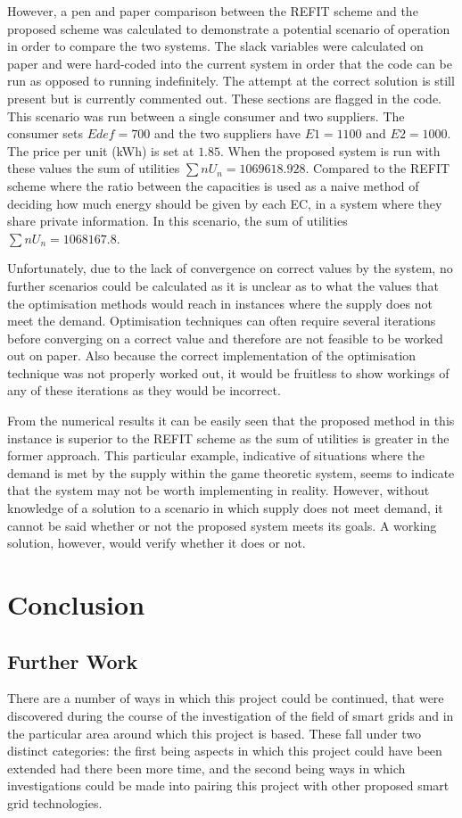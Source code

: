 \documentclass[a4paper, notitlepage]{report}
\begin{document}
However, a pen and paper comparison between the REFIT scheme and the proposed
scheme was calculated to demonstrate a potential scenario of operation in order
to compare the two systems. The slack variables were calculated on paper and
were hard-coded into the current system in order that the code can be run as
opposed to running indefinitely. The attempt at the correct solution is still
present but is currently commented out. These sections are flagged in the code.
This scenario was run between a single consumer and two suppliers. The consumer
sets \(Edef= 700\) and the two suppliers have \(E1 = 1100\) and \(E2 = 1000\). The
price per unit (kWh) is set at \(1.85\). When the proposed system is run with
these values the sum of utilities \(∑n U_n = 1069618.928\). Compared to the REFIT
scheme where the ratio between the capacities is used as a naive method of
deciding how much energy should be given by each EC, in a system where they
share private information. In this scenario, the sum of utilities \(∑n U_n =
1068167.8\).

Unfortunately, due to the lack of convergence on correct values by the system, no
further scenarios could be calculated as it is unclear as to what the values
that the optimisation methods would reach in instances where the supply does not
meet the demand. Optimisation techniques can often require several iterations
before converging on a correct value and therefore are not feasible to be worked
out on paper. Also because the correct implementation of the optimisation
technique was not properly worked out, it would be fruitless to show workings of
any of these iterations as they would be incorrect.

From the numerical results it can be easily seen that the proposed method in
this instance is superior to the REFIT scheme as the sum of utilities is greater
in the former approach. This particular example, indicative of situations where
the demand is met by the supply within the game theoretic system, seems to
indicate that the system may not be worth implementing in reality. However,
without knowledge of a solution to a scenario in which supply does not meet
demand, it cannot be said whether or not the proposed system meets its goals. A working
solution, however, would verify whether it does or not.
\part{Conclusion}
\label{sec:org6ada160}
\chapter{Further Work}
\label{sec:org7ef1566}
There are a number of ways in which this project could be continued, that were
discovered during the course of the investigation of the field of smart grids
and in the particular area around which this project is based. These fall under
two distinct categories: the first being aspects in which this project could
have been extended had there been more time, and the second being ways in which
investigations could be made into pairing this project with other proposed smart
grid technologies.
\end{document}
